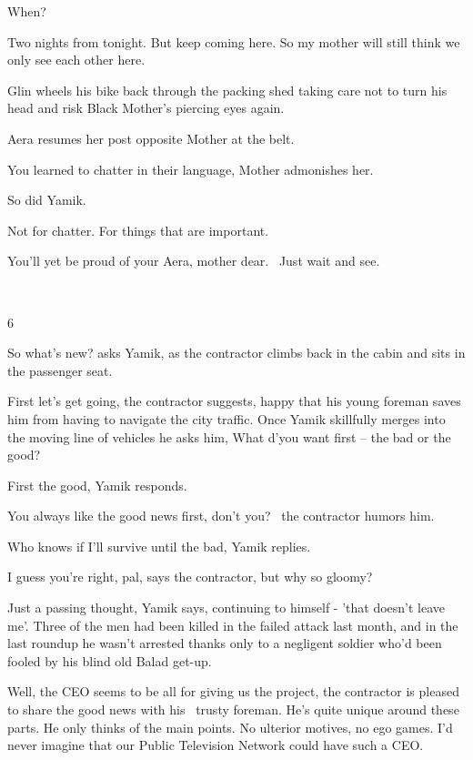 \documentclass[12pt]{book}
\begin{document}
{\textquotedbl}When?{\textquotedbl}

{\textquotedbl}Two nights from tonight. But keep coming here. So my mother will still think we only see each other
here.{\textquotedbl}

Glin wheels his bike back through the packing shed taking care not to turn his head and risk Black Mother's piercing
eyes again.

Aera resumes her post opposite Mother at the belt.

{\textquotedbl}You learned to chatter in their language,{\textquotedbl} Mother admonishes her.

{\textquotedbl}So did Yamik.{\textquotedbl}

{\textquotedbl}Not for chatter. For things that are important.{\textquotedbl}

{\textquotedbl}You'll yet be proud of your Aera, mother dear.~ Just wait and see.{\textquotedbl}

~

6

{\textquotedbl}So what's new?{\textquotedbl} asks Yamik, as the contractor climbs back in the cabin and sits in the
passenger seat.

{\textquotedbl}First let's get going,{\textquotedbl} the contractor suggests, happy that his young foreman saves him
from having to navigate the city traffic. Once Yamik skillfully merges into the moving line of vehicles he asks him,
{\textquotedbl}What d'you want first -- the bad or the good?{\textquotedbl}

{\textquotedbl}First the good,{\textquotedbl} Yamik responds.

{\textquotedbl}You always like the good news first, don't you?{\textquotedbl} \ the contractor humors him.

{\textquotedbl}Who knows if I'll survive until the bad,{\textquotedbl} Yamik replies.{ }

{\textquotedbl}I guess you're right, pal,{\textquotedbl} says the contractor, {\textquotedbl}but why so
gloomy?{\textquotedbl}

{\textquotedbl}Just a passing thought,{\textquotedbl} Yamik says, continuing to himself - 'that doesn't leave me'. Three
of the men had been killed in the failed attack last month, and in the last roundup he wasn't arrested thanks only to a
negligent soldier who'd been fooled by his blind old Balad get-up.

{\textquotedbl}Well, the CEO seems to be all for giving us the project,{\textquotedbl} the contractor is pleased to
share the good news with his \ trusty foreman. {\textquotedbl}He's quite unique around these parts. He only thinks of
the main points. No ulterior motives, no ego games. I'd never imagine that our Public Television Network could have
such a CEO.{\textquotedbl}
\end{document}
